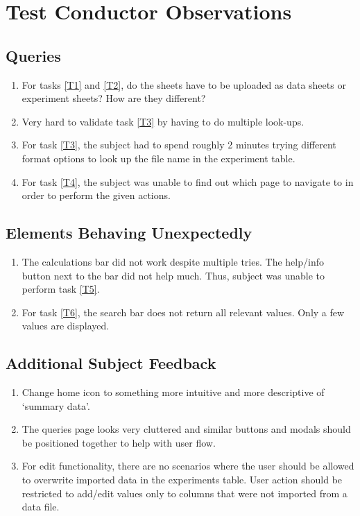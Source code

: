 \documentclass{article}
\begin{document}
\section{Test Conductor Observations}
\subsection{Queries}
\begin{enumerate}
  \item For tasks \ref{T1} and \ref{T2}, do the sheets have to be uploaded as data sheets or experiment sheets? How 
  are they different? \label{Q1} 
  \item Very hard to validate task \ref{T3} by having to do multiple look-ups. \label{Q2}
  \item For task \ref{T3}, the subject had to spend roughly 2 minutes trying different format options to look up the file name in the 
  experiment table. \label{Q3}
  \item For task \ref{T4}, the subject was unable to find out which page to navigate to in order to perform the given actions. \label{Q4}
\end{enumerate}

\subsection{Elements Behaving Unexpectedly}
\begin{enumerate}
  \item The calculations bar did not work despite multiple tries. The help/info button next to the bar did not help much. Thus, subject was 
  unable to perform task \ref{T5}.
  \item For task \ref{T6}, the search bar does not return all relevant values. Only a few values are displayed.
\end{enumerate}

\subsection{Additional Subject Feedback}
\begin{enumerate}
  \item Change home icon to something more intuitive and more descriptive of `summary data'.
  \item The queries page looks very cluttered and similar buttons and modals should be positioned together to help with user flow.
  \item For edit functionality, there are no scenarios where the user should be allowed to overwrite imported data in the experiments table. 
  User action should be restricted to add/edit values only to columns that were not imported from a data file.
\end{enumerate}
\end{document}
